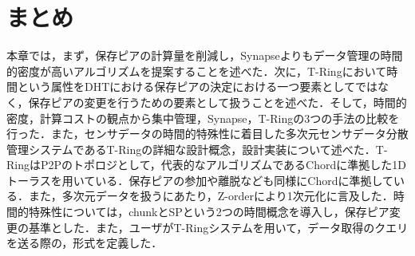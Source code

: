 \section{まとめ}
本章では，まず，保存ピアの計算量を削減し，Synapseよりもデータ管理の時間的密度が高いアルゴリズムを提案することを述べた．次に，T-Ringにおいて時間という属性をDHTにおける保存ピアの決定における一つ要素としてではなく，保存ピアの変更を行うための要素として扱うことを述べた．そして，時間的密度，計算コストの観点から集中管理，Synapse，T-Ringの3つの手法の比較を行った．また，センサデータの時間的特殊性に着目した多次元センサデータ分散管理システムであるT-Ringの詳細な設計概念，設計実装について述べた．T-RingはP2Pのトポロジとして，代表的なアルゴリズムであるChordに準拠した1Dトーラスを用いている．保存ピアの参加や離脱なども同様にChordに準拠している．また，多次元データを扱うにあたり，Z-orderにより1次元化に言及した．時間的特殊性については，chunkとSPという2つの時間概念を導入し，保存ピア変更の基準とした．また，ユーザがT-Ringシステムを用いて，データ取得のクエリを送る際の，形式を定義した．



